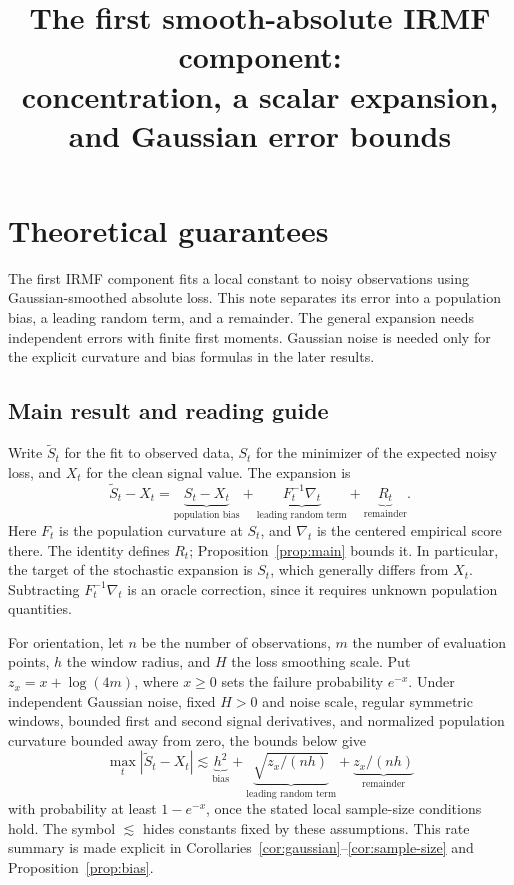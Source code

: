 \documentclass[11pt]{article}
\title{The first smooth-absolute IRMF component:\\
concentration, a scalar expansion, and Gaussian error bounds}
\author{}
\date{}
\begin{document}
\maketitle

\setcounter{section}{3}
\section{Theoretical guarantees}

The first IRMF component fits a local constant to noisy observations using
Gaussian-smoothed absolute loss.  This note separates its error into a
population bias, a leading random term, and a remainder.  The general expansion
needs independent errors with finite first moments.  Gaussian noise is needed
only for the explicit curvature and bias formulas in the later results.

\subsection*{Main result and reading guide}
Write \(\widetilde S_t\) for the fit to observed data, \(S_t\) for the
minimizer of the expected noisy loss, and \(X_t\) for the clean signal value.
The expansion is
\[
  \boxed{\widetilde S_t-X_t
    =\underbrace{S_t-X_t}_{\text{population bias}}
     +\underbrace{F_t^{-1}\nabla_t}_{\text{leading random term}}
     +\underbrace{R_t}_{\text{remainder}}.}
\]
Here \(F_t\) is the population curvature at \(S_t\), and \(\nabla_t\) is the
centered empirical score there.  The identity defines \(R_t\);
Proposition~\ref{prop:main} bounds it.  In particular, the target of the
stochastic expansion is \(S_t\), which generally differs from \(X_t\).
Subtracting \(F_t^{-1}\nabla_t\) is an oracle correction, since it requires
unknown population quantities.

For orientation, let \(n\) be the number of observations, \(m\) the number of
evaluation points, \(h\) the window radius, and \(H\) the loss smoothing
scale.  Put \(z_x=x+\log(4m)\), where \(x\geq0\) sets the failure probability
\(e^{-x}\).  Under independent Gaussian noise, fixed \(H>0\) and noise scale,
regular symmetric windows, bounded first and second signal derivatives, and
normalized population curvature bounded away from zero, the bounds below give
\[
  \max_t|\widetilde S_t-X_t|
  \lesssim
  \underbrace{h^2}_{\text{bias}}
  +\underbrace{\sqrt{z_x/(nh)}}_{\text{leading random term}}
  +\underbrace{z_x/(nh)}_{\text{remainder}}
\]
with probability at least \(1-e^{-x}\), once the stated local sample-size
conditions hold.  The symbol \(\lesssim\) hides constants fixed by these
assumptions.  This rate summary is made explicit in
Corollaries~\ref{cor:gaussian}--\ref{cor:sample-size} and
Proposition~\ref{prop:bias}.
\end{document}

